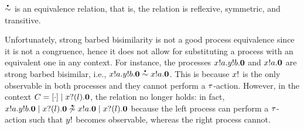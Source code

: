 \documentclass[runningheads]{llncs}
\begin{document}
\begin{theorem}
  \( \sbbisim{}{} \) is an equivalence relation, that is, the relation is reflexive, symmetric, and transitive.
\end{theorem}

Unfortunately, strong barbed bisimilarity is not a good process
equivalence since it is not a congruence, hence it does not allow for
substituting a process with an equivalent one in any context.
For instance, the processes $x ! a . y ! b . \bm{0}$ and
$x ! a . \bm{0}$ are strong barbed bisimilar, i.e.,
$\sbbisim{\Pout{x}{a}{\Pout{y}{b}{\Pend}}}{\Pout{x}{a}{\Pend}}$. This
is because \( x! \) is the only observable in both processes
and they cannot perform a \( \tau \)-action. However, in the context 
$C = [\cdot] \mid x ? (l) . \bm{0}$, the relation no
longer holds: in fact,
$\nsbbisim{\Ppar{\Pout{x}{a}{\Pout{y}{b}{\Pend}}}{\Pin{x}{l}{\Pend}}}{\Pout{x}{a}{\Pend}\Ppar{}{\Pin{x}{l}{\Pend}}}$
%
because the left process can perform a \( \tau \)-action such that
\( y! \) becomes observable, whereas the right process cannot.




\end{document}
